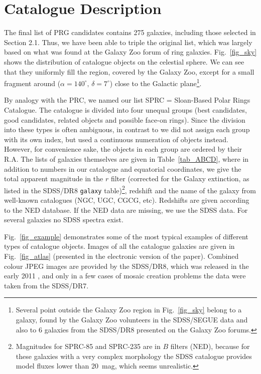 \documentclass[useAMS,usenatbib]{mn2e}
\begin{document}
\section{Catalogue Description}
\label{sec_ABCD}


The final list of PRG candidates contains  275 galaxies, including
those  selected in Section 2.1. Thus, we have been able
to triple the original list, which was largely based on what was
found at the Galaxy Zoo forum of ring galaxies.
Fig.~\ref{fig_sky} shows the distribution of catalogue objects
on the celestial sphere. We can see that they uniformly fill the
region, covered by the Galaxy Zoo, except for a small fragment
around ($\alpha=140^\circ,\,\delta=7^\circ$) close to the Galactic
plane\footnote{ Several point outside the Galaxy Zoo region in
Fig.~\ref{fig_sky} belong to a galaxy, found by the Galaxy Zoo
volunteers in the  SDSS/SEGUE data and also to 6 galaxies from the SDSS/DR8
 presented on the Galaxy Zoo forums.}.


By analogy with the PRC, we named our list SPRC = Sloan-Based
Polar Rings Catalogue.  The catalogue is divided into four unequal
groups (best candidates, good candidates, related objects and
possible face-on rings). Since the division into these types is often
ambiguous, in contrast to \citet{Whitmore1990} we did not assign
each group with its own index, but used a continuous numeration of
objects instead. However, for convenience sake, the objects in
each group are ordered by their R.A. The lists of galaxies themselves are
given in Table~\ref{tab_ABCD}, where in addition to numbers in our
catalogue and equatorial coordinates, we give the total apparent
magnitude in the $r$ filter (corrected for the Galaxy extinction,  as listed in the
SDSS/DR8 \texttt{galaxy} table)\footnote{ Magnitudes for SPRC-85 and SPRC-235 are in $B$
filters  (NED), because for these galaxies with a  very complex morphology the SDSS catalogue
provides model fluxes lower than 20~mag, which seems unrealistic.},
redshift and the name of the galaxy from well-known catalogues (NGC, UGC, CGCG,
etc). Redshifts are given according to the NED database. If the
NED data are missing, we use the SDSS data. For several galaxies
no SDSS spectra exist.


Fig.~\ref{fig_example} demonstrates some of the most typical
examples of different types of catalogue objects. Images of all
the catalogue galaxies are given in Fig.~\ref{fig_atlas}
(presented in the electronic version of the paper). Combined
colour JPEG images are provided by   the SDSS/DR8, which was released in the early 2011
\citep{sdssdr8}, and only in a few cases of mosaic creation
problems the data were taken from the SDSS/DR7.
\end{document}
